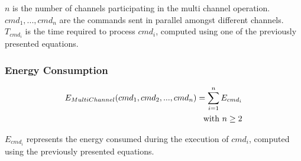\documentclass[oneside]{memoir}
\begin{document}
$n$ is the number of channels participating in the multi channel operation.\\$cmd_1, ... , cmd_n$ are the commands sent in parallel amongst different channels. $T_{cmd_i}$ is the time required to process $cmd_i$, computed using one of the previously presented equations.

\subsubsection{Energy Consumption}

\begin{align} E_{MultiChannel}(cmd_1, cmd_2, ... , cmd_n) = \sum\limits_{i=1}^n E_{cmd_i}
\notag\\\text{with } n \ge 2
\end{align}

$E_{cmd_i}$ represents the energy consumed during the execution of $cmd_i$, computed using the previously presented equations.
\end{document}
